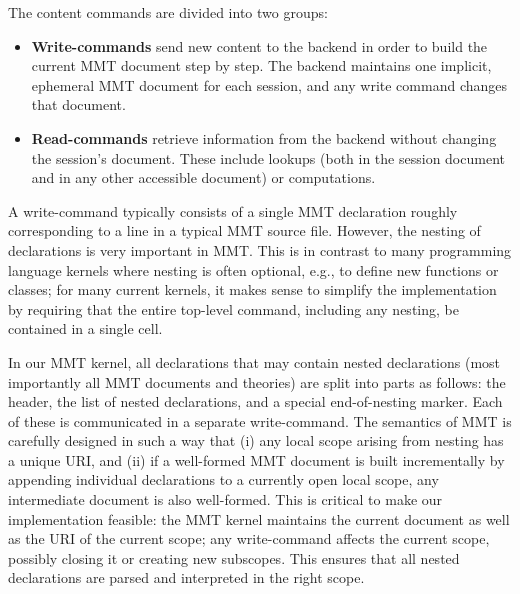 The content commands are divided into two groups:
\begin{itemize}
 \item \textbf{Write-commands} send new content to the backend in order to build the current MMT document step by step.
   The backend maintains one implicit, ephemeral MMT document for each session, and any write command changes that document.
 \item \textbf{Read-commands} retrieve information from the backend without changing the session's document.
   These include lookups (both in the session document and in any other accessible document) or computations.
\end{itemize}

A write-command typically consists of a single MMT declaration roughly corresponding to a line in a typical MMT source file.
However, the nesting of declarations is very important in MMT.
This is in contrast to many programming language kernels where nesting is often optional, e.g., to define new functions or classes;
for many current kernels, it makes sense to simplify the implementation by requiring that the entire top-level command, including any nesting, be contained in a single cell.

In our MMT kernel, all declarations that may contain nested declarations (most importantly all MMT documents and theories) are split into parts as follows: the header, the list of nested declarations, and a special end-of-nesting marker.
Each of these is communicated in a separate write-command.
The semantics of MMT is carefully designed in such a way that (i) any local scope arising from nesting has a unique URI, and (ii) if a well-formed MMT document is built incrementally by appending individual declarations to a currently open local scope, any intermediate document is also well-formed.
This is critical to make our implementation feasible: the MMT kernel maintains the current document as well as the URI of the current scope; any write-command affects the current scope, possibly closing it or creating new subscopes.
This ensures that all nested declarations are parsed and interpreted in the right scope.

